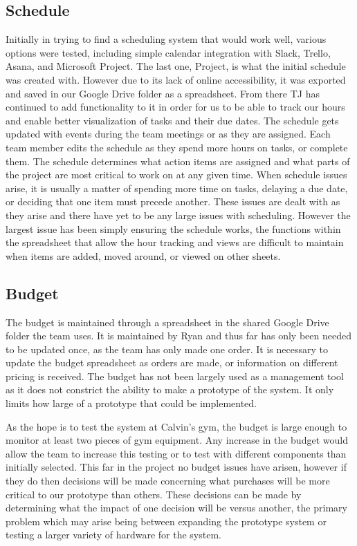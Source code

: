 \documentclass[PPFS.tex]{template/subfiles}
\begin{document}
    \subsection{Schedule}
	Initially in trying to find a scheduling system that would work well, various options were tested, including simple calendar integration with Slack, Trello, Asana, and Microsoft Project. The last one, Project, is what the initial schedule was created with. However due to its lack of online accessibility, it was exported and saved in our Google Drive folder as a spreadsheet. From there TJ has continued to add functionality to it in order for us to be able to track our hours and enable better visualization of tasks and their due dates. The schedule gets updated with events during the team meetings or as they are assigned. Each team member edits the schedule as they spend more hours on tasks, or complete them. The schedule determines what action items are assigned and what parts of the project are most critical to work on at any given time. When schedule issues arise, it is usually a matter of spending more time on tasks, delaying a due date, or deciding that one item must precede another. These issues are dealt with as they arise and there have yet to be any large issues with scheduling. However the largest issue has been simply ensuring the schedule works, the functions within the spreadsheet that allow the hour tracking and views are difficult to maintain when items are added, moved around, or viewed on other sheets. 
	
    \subsection{Budget}
    The budget is maintained through a spreadsheet in the shared Google Drive folder the team uses. It is maintained by Ryan and thus far has only been needed to be updated once, as the team has only made one order. It is necessary to update the budget spreadsheet as orders are made, or information on different pricing is received. The budget has not been largely used as a management tool as it does not constrict the ability to make a prototype of the system. It only limits how large of a prototype that could be implemented.  
    
    As the hope is to test the system at Calvin's gym, the budget is large enough to monitor at least two pieces of gym equipment. Any increase in the budget would allow the team to increase this testing or to test with different components than initially selected. This far in the project no budget issues have arisen, however if they do then decisions will be made concerning what purchases will be more critical to our prototype than others. These decisions can be made by determining what the impact of one decision will be versus another, the primary problem which may arise being between expanding the prototype system or testing a larger variety of hardware for the system. 
	
\end{document}
